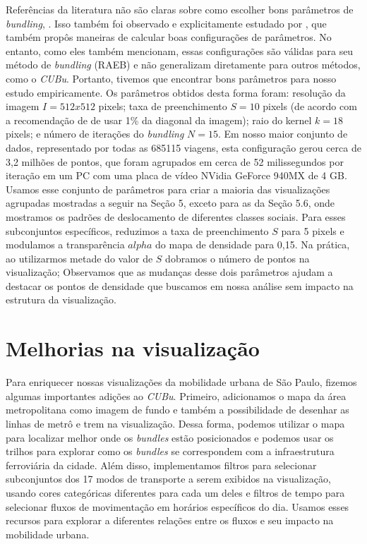 Referências da literatura não são claras sobre como escolher bons parâmetros de
\emph{bundling}, \cite{lhuillier:17}. Isso também foi observado e explicitamente
estudado por \cite{zeng:19}, que também propôs maneiras de calcular boas
configurações de parâmetros. No entanto, como eles também mencionam, essas
configurações são válidas para seu método de \emph{bundling} (RAEB) e não
generalizam diretamente para outros métodos, como o \emph{CUBu}. Portanto,
tivemos que encontrar bons parâmetros para nosso estudo empiricamente. Os
parâmetros obtidos desta forma foram: resolução da imagem $I = 512 x 512$
pixels; taxa de preenchimento $S = 10$ pixels (de acordo com a recomendação de
\cite{zwan:16} de usar 1\% da diagonal da imagem); raio do kernel $k = 18$
pixels; e número de iterações do \emph{bundling} $N = 15$. Em nosso maior
conjunto de dados, representado por todas as \num{685115} viagens, esta
configuração gerou cerca de 3,2 milhões de pontos, que foram agrupados em cerca
de 52 milissegundos por iteração em um PC com uma placa de vídeo NVidia GeForce
940MX de 4 GB. Usamos esse conjunto de parâmetros para criar a maioria das
visualizações agrupadas mostradas a seguir na Seção 5, exceto para as da Seção
5.6, onde mostramos os padrões de deslocamento de diferentes classes sociais.
Para esses subconjuntos específicos, reduzimos a taxa de preenchimento $S$ para
5 pixels e modulamos a transparência $alpha$ do mapa de densidade para 0,15. Na
prática, ao utilizarmos metade do valor de $S$ dobramos o número de pontos na
visualização;  Observamos que as mudanças desse dois parâmetros ajudam a
destacar os pontos de densidade que buscamos em nossa análise sem impacto na
estrutura da visualização.


\section{Melhorias na visualização}

Para enriquecer nossas visualizações da mobilidade urbana de São Paulo, fizemos
algumas importantes adições ao \emph{CUBu}. Primeiro, adicionamos o mapa da área
metropolitana como imagem de fundo e também a possibilidade de desenhar as
linhas de metrô e trem na visualização. Dessa forma, podemos utilizar o
mapa para localizar melhor onde os \emph{bundles} estão posicionados e podemos
usar os trilhos para explorar como os \emph{bundles} se correspondem com a
infraestrutura ferroviária da cidade. Além disso, implementamos filtros para
selecionar subconjuntos dos 17 modos de transporte a serem exibidos na
visualização, usando cores categóricas diferentes para cada um deles e filtros
de tempo para selecionar fluxos de movimentação em horários específicos do dia. Usamos esses
recursos para explorar a diferentes relações entre os fluxos e seu impacto na
mobilidade urbana.
